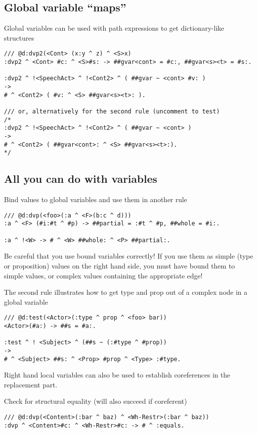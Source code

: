 \subsection{
 Global variable ``maps''
}
 Global variables can be used with path expressions to get
dictionary-like structures
\begin{verbatim}
/// @d:dvp2(<Cont> (x:y ^ z) ^ <S>x)
:dvp2 ^ <Cont> #c: ^ <S>#s: -> ##gvar<cont> = #c:, ##gvar<s><t> = #s:.

:dvp2 ^ !<SpeechAct> ^ !<Cont2> ^ ( ##gvar ~ <cont> #v: )
->
# ^ <Cont2> ( #v: ^ <S> ##gvar<s><t>: ).

/// or, alternatively for the second rule (uncomment to test)
/*
:dvp2 ^ !<SpeechAct> ^ !<Cont2> ^ ( ##gvar ~ <cont> )
->
# ^ <Cont2> ( ##gvar<cont>: ^ <S> ##gvar<s><t>:).
*/
\end{verbatim}

\subsection{
 All you can do with variables
}
 Bind values to global variables and use them in another rule
\begin{verbatim}
/// @d:dvp(<foo>(:a ^ <F>(b:c ^ d)))
:a ^ <F> (#i:#t ^ #p) -> ##partial = :#t ^ #p, ##whole = #i:.

:a ^ !<W> -> # ^ <W> ##whole: ^ <P> ##partial:.
\end{verbatim}


  Be careful that you use bound variables correctly! If you use
 them as simple (type or proposition) values on the right hand side, you
 must have bound them to simple values, or complex values containing the
 appropriate edge!

The second rule illustrates how to get type and prop out of a complex node
in a global variable
\begin{verbatim}
/// @d:test(<Actor>(:type ^ prop ^ <foo> bar))
<Actor>(#a:) -> ##s = #a:.

:test ^ ! <Subject> ^ (##s ~ (:#type ^ #prop))
->
# ^ <Subject> ##s: ^ <Prop> #prop ^ <Type> :#type.
\end{verbatim}

Right hand local variables can also be used to establish coreferences in the
replacement part. \vspace*{1.0ex}

 Check for structural equality (will also succeed if coreferent)
\begin{verbatim}
/// @d:dvp(<Content>(:bar ^ baz) ^ <Wh-Restr>(:bar ^ baz))
:dvp ^ <Content>#c: ^ <Wh-Restr>#c: -> # ^ :equals.
\end{verbatim}

